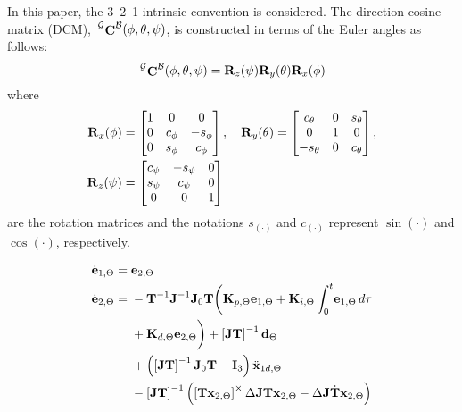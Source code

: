 
In this paper, the 3--2--1 intrinsic convention is considered. The direction cosine matrix (DCM), $\sideset{^\mathcal{G}}{^\mathcal{B}}{\mathop{\mathbf{C}}}(\phi, \theta, \psi)$, is constructed in terms of the Euler angles as follows:
\begin{equation} \label{eq::DCM}
    \sideset{^\mathcal{G}}{^\mathcal{B}}{\mathop{\mathbf{C}}}(\phi, \theta, \psi) = \mathbf{R}_z(\psi) \mathbf{R}_y(\theta)  \mathbf{R}_x(\phi)
\end{equation}
where
\begin{equation}
    \begin{aligned}
        \bm{\mathrm{R}}_x(\phi) &=
        \begin{bmatrix}
            1 & 0      & 0     \\
            0 & c_{\phi}  & -s_{\phi} \\
            0 & s_{\phi} & c_{\phi}
        \end{bmatrix},\quad 
        \bm{\mathrm{R}}_y(\theta) =
        \begin{bmatrix}
            c_{\theta} & 0 & s_{\theta} \\
            0       & 1 & 0        \\
            -s_{\theta} & 0 & c_{\theta}
        \end{bmatrix},\\
        \bm{\mathrm{R}}_z(\psi) &=
        \begin{bmatrix}
            c_{\psi}  & -s_{\psi} & 0 \\
            s_{\psi}  & c_{\psi} & 0 \\
            0      & 0     & 1
        \end{bmatrix}
    \end{aligned}
\end{equation}
are the rotation matrices and the notations $s_{(\cdot)}$ and $c_{(\cdot)}$ represent $\sin(\cdot)$ and $\cos(\cdot)$, respectively. 

\begin{equation} \label{eq:attitude_error_dynamics}
    \begin{aligned}
        \dot{\bm{\mathrm{e}}}_{1,\Theta} ={}& \bm{\mathrm{e}}_{2,\Theta} \\
        \dot{\bm{\mathrm{e}}}_{2,\Theta} ={}& -\bm{\mathrm{T}}^{-1} \bm{\mathrm{J}}^{-1} \bm{\mathrm{J}}_0 \bm{\mathrm{T}} \bigg(\bm{\mathrm{K}}_{p,\Theta} \bm{\mathrm{e}}_{1,\Theta} + \bm{\mathrm{K}}_{i,\Theta} \int^t_0 \! \bm{\mathrm{e}}_{1,\Theta}\,d\tau \\
        &+ \bm{\mathrm{K}}_{d,\Theta} \bm{\mathrm{e}}_{2,\Theta} \bigg) +\left[\bm{\mathrm{JT}}\right]^{-1}\bm{\mathrm{d}}_{\Theta} \\
        &+\left(\left[\bm{\mathrm{JT}}\right]^{-1} \bm{\mathrm{J}}_0 \bm{\mathrm{T}} -\bm{\mathrm{I}}_3 \right)\ddot{\bm{\mathrm{x}}}_{1d,\Theta} \\
        &- \left[\bm{\mathrm{JT}}\right]^{-1} \left( \left[ \bm{\mathrm{T}}\bm{\mathrm{x}}_{2,\Theta} \right]^{\times} \Delta \bm{\mathrm{J}} \bm{\mathrm{T}} \bm{\mathrm{x}}_{2,\Theta} -\Delta \bm{\mathrm{J}} \dot{\bm{\mathrm{T}}}\bm{\mathrm{x}}_{2,\Theta} \right)
    \end{aligned}
\end{equation}
